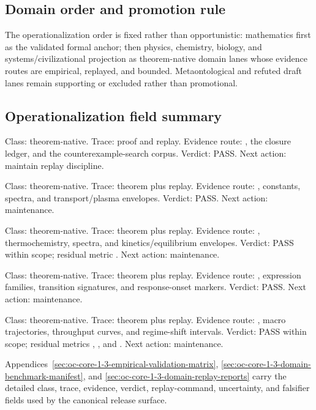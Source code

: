 \subsection{Domain order and promotion rule}
The operationalization order is fixed rather than opportunistic: mathematics
first as the validated formal anchor; then physics, chemistry, biology, and
systems/civilizational projection as theorem-native domain lanes whose evidence
routes are empirical, replayed, and bounded. Metaontological and refuted draft
lanes remain supporting or excluded rather than promotional.

\subsection{Operationalization field summary}
\begin{description}[leftmargin=0pt,labelwidth=0pt,labelsep=0pt,itemsep=0.55em]
\item[\textbf{Mathematics.}]
Class: theorem-native. Trace: proof and replay. Evidence route:
, the closure ledger, and the
counterexample-search corpus. Verdict: PASS. Next action: maintain replay
discipline.
\item[\textbf{Physics.}]
Class: theorem-native. Trace: theorem plus replay. Evidence route:
, constants, spectra, and transport/plasma envelopes.
Verdict: PASS. Next action: maintenance.
\item[\textbf{Chemistry.}]
Class: theorem-native. Trace: theorem plus replay. Evidence route:
, thermochemistry, spectra, and kinetics/equilibrium
envelopes. Verdict: PASS within scope; residual metric
. Next action: maintenance.
\item[\textbf{Biology.}]
Class: theorem-native. Trace: theorem plus replay. Evidence route:
, expression families, transition signatures, and
response-onset markers. Verdict: PASS. Next action: maintenance.
\item[\textbf{Systems / Civilizational projection.}]
Class: theorem-native. Trace: theorem plus replay. Evidence route:
, macro trajectories, throughput curves, and
regime-shift intervals. Verdict: PASS within scope; residual metrics
, , and
. Next action: maintenance.
\end{description}
Appendices~\ref{sec:oc-core-1-3-empirical-validation-matrix},
\ref{sec:oc-core-1-3-domain-benchmark-manifest}, and
\ref{sec:oc-core-1-3-domain-replay-reports} carry the detailed class, trace, evidence,
verdict, replay-command, uncertainty, and falsifier fields used by the canonical
release surface.

